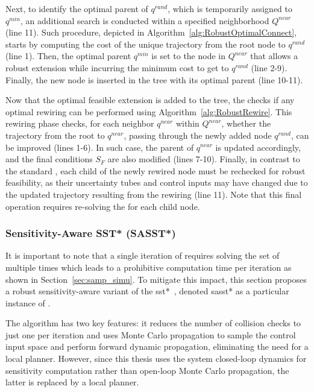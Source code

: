 Next, to identify the optimal parent of $q^{rand}$, which is temporarily assigned to $q^{min}$, an additional search is conducted within a specified neighborhood $Q^{near}$ (line 11).
Such procedure, depicted in Algorithm~\ref{alg:RobustOptimalConnect}, starts by computing the cost of the unique trajectory from the root node to $q^{rand}$ (line 1).
Then, the optimal parent $q^{min}$ is set to the node in $Q^{near}$ that allows a robust extension while incurring the minimum cost to get to $q^{rand}$ (line 2-9).
Finally, the new node is inserted in the tree with its optimal parent (line 10-11).

Now that the optimal feasible extension is added to the tree, the  checks if any optimal rewiring can be performed using Algorithm~\ref{alg:RobustRewire}.
This rewiring phase checks, for each neighbor $q^{near}$ within $Q^{near}$, whether the trajectory from the root to $q^{near}$, passing through the newly added node $q^{rand}$, can be improved (lines 1-6).
In such case, the parent of $q^{near}$ is updated accordingly, and the final  conditions $S_F$ are also modified (lines 7-10).
Finally, in contrast to the standard , each child of the newly rewired node must be rechecked for robust feasibility, as their uncertainty tubes and control inputs may have changed due to the updated trajectory resulting from the rewiring (line 11).
Note that this final operation requires re-solving the  for each child node.

\subsubsection{Sensitivity-Aware SST* (SASST*)}

It is important to note that a single iteration of  requires solving the set of  multiple times which leads to a prohibitive computation time per iteration as shown in Section~\ref{sec:samp_simu}.
To mitigate this impact, this section proposes a robust sensitivity-aware variant of the \gls{sst*}~\cite{cSST}, denoted \gls{sasst*} as a particular instance of . 

The  algorithm has two key features: it reduces the number of collision checks to just one per iteration and uses Monte Carlo propagation to sample the control input space and perform forward dynamic propagation, eliminating the need for a local planner.
However, since this thesis uses the system closed-loop dynamics for sensitivity computation rather than open-loop Monte Carlo propagation, the latter is replaced by a local planner.

